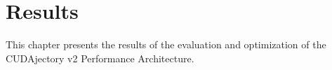 \chapter{Results}
This chapter presents the results of the evaluation and optimization of the CUDAjectory v2 Performance Architecture.


